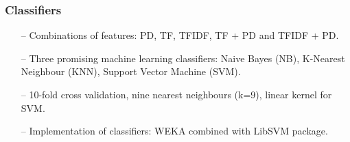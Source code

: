 \documentclass{beamer}
\begin{document}
 
\begin{frame}
\frametitle{Classifiers}
\begin{itemize}

\item[--] Combinations of features: PD, TF, TFIDF, TF + PD and TFIDF + PD.
\item[--] Three promising machine learning classifiers: Naive Bayes (NB), K-Nearest Neighbour (KNN), Support Vector Machine (SVM).
\item[--] 10-fold cross validation, nine nearest neighbours (k=9), linear kernel for SVM.
\item[--] Implementation of classifiers: WEKA combined with LibSVM package.
\end{itemize}
\end{frame}
\end{document}
